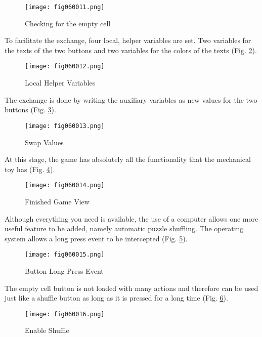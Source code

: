 \begin{figure}[H]
   \centering
   \texttt{[image: fig060011.png]}
   \caption{Checking for the empty cell}
\label{fig060011}
\end{figure}

To facilitate the exchange, four local, helper variables are set. Two variables for the texts of the two buttons and two variables for the colors of the texts (Fig. \ref{fig060012}).

\begin{figure}[H]
   \centering
   \texttt{[image: fig060012.png]}
   \caption{Local Helper Variables}
\label{fig060012}
\end{figure}

The exchange is done by writing the auxiliary variables as new values for the two buttons (Fig. \ref{fig060013}).

\begin{figure}[H]
   \centering
   \texttt{[image: fig060013.png]}
   \caption{Swap Values}
\label{fig060013}
\end{figure}

At this stage, the game has absolutely all the functionality that the mechanical toy has (Fig. \ref{fig060014}).

\begin{figure}[H]
   \centering
   \texttt{[image: fig060014.png]}
   \caption{Finished Game View}
\label{fig060014}
\end{figure}

Although everything you need is available, the use of a computer allows one more useful feature to be added, namely automatic puzzle shuffling. The operating system allows a long press event to be intercepted (Fig. \ref{fig060015}).

\begin{figure}[H]
   \centering
   \texttt{[image: fig060015.png]}
   \caption{Button Long Press Event}
\label{fig060015}
\end{figure}

The empty cell button is not loaded with many actions and therefore can be used just like a shuffle button as long as it is pressed for a long time (Fig. \ref{fig060016}).

\begin{figure}[H]
   \centering
   \texttt{[image: fig060016.png]}
   \caption{Enable Shuffle}
\label{fig060016}
\end{figure}


